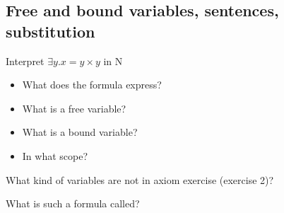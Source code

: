\documentclass[fleqn]{article}
\begin{document}
\subsection{Free and bound variables, sentences, substitution}
\begin{enumerate}
    \item Interpret $\exists y. x=y\times y$ in N
    \begin{itemize}
        \item What does the formula express?
        \item What is a free variable?
        \item What is a bound variable?
        \item In what scope?
    \end{itemize}
    {\color{red}\item What kind of variables are not in axiom exercise (exercise 2)?}
    {\color{red}\item What is such a formula called?}
\end{enumerate}
\end{document}
